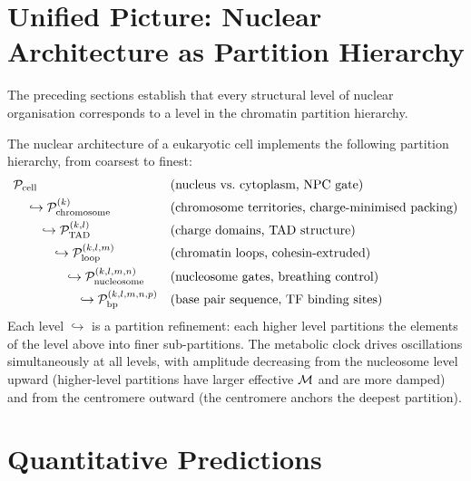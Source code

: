 \section{Unified Picture: Nuclear Architecture as Partition Hierarchy}
\label{sec:unified_nuclear}

The preceding sections establish that every structural level of nuclear
organisation corresponds to a level in the chromatin partition hierarchy.

\begin{proposition}
\label{prop:nuclear_architecture_hierarchy}
The nuclear architecture of a eukaryotic cell implements the following
partition hierarchy, from coarsest to finest:
\begin{align}
  &\mathcal{P}_{\mathrm{cell}} && (\text{nucleus vs.\ cytoplasm, NPC gate})
  \nonumber\\
  &\quad\hookrightarrow \mathcal{P}_{\mathrm{chromosome}}^{(k)} && (\text{chromosome territories, charge-minimised packing})
  \nonumber\\
  &\quad\quad\hookrightarrow \mathcal{P}_{\mathrm{TAD}}^{(k,l)} && (\text{charge domains, TAD structure})
  \nonumber\\
  &\quad\quad\quad\hookrightarrow \mathcal{P}_{\mathrm{loop}}^{(k,l,m)} && (\text{chromatin loops, cohesin-extruded})
  \nonumber\\
  &\quad\quad\quad\quad\hookrightarrow \mathcal{P}_{\mathrm{nucleosome}}^{(k,l,m,n)} && (\text{nucleosome gates, breathing control})
  \nonumber\\
  &\quad\quad\quad\quad\quad\hookrightarrow \mathcal{P}_{\mathrm{bp}}^{(k,l,m,n,p)} && (\text{base pair sequence, TF binding sites})
\end{align}
Each level $\hookrightarrow$ is a partition refinement: each higher level
partitions the elements of the level above into finer sub-partitions.
The metabolic clock drives oscillations simultaneously at all levels,
with amplitude decreasing from the nucleosome level upward (higher-level
partitions have larger effective $\mathcal{M}$ and are more damped) and from
the centromere outward (the centromere anchors the deepest partition).
\end{proposition}

\section{Quantitative Predictions}
\label{sec:architecture_predictions}


